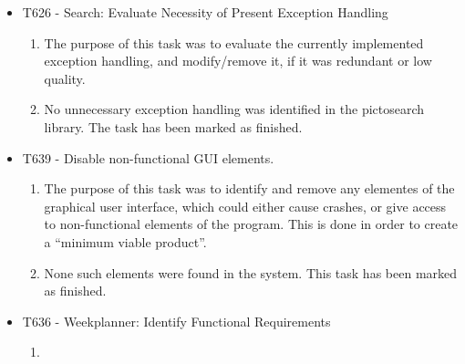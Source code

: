 \begin{itemize}
  	\item T626 - Search: Evaluate Necessity of Present Exception Handling
		\begin{enumerate}
	  		\item The purpose of this task was to evaluate the currently implemented
	  		exception handling, and modify/remove it, if it was redundant or low
	  		quality.
 			\item No unnecessary exception handling was identified in the pictosearch
 			library. The task has been marked as finished.
		\end{enumerate}
  	\item T639 - Disable non-functional GUI elements.
		\begin{enumerate}
 			\item The purpose of this task was to identify and remove any elementes of
 			the graphical user interface, which could either cause crashes, or give
 			access to non-functional elements of the program. This is done in order to
 			create a ``minimum viable product''.
 			\item None such elements were found in the system. This task has been marked
 			as finished.
		\end{enumerate}
	\item T636 - Weekplanner: Identify Functional Requirements
	\begin{enumerate}
 		\item {}
	\end{enumerate}

\end{itemize}


